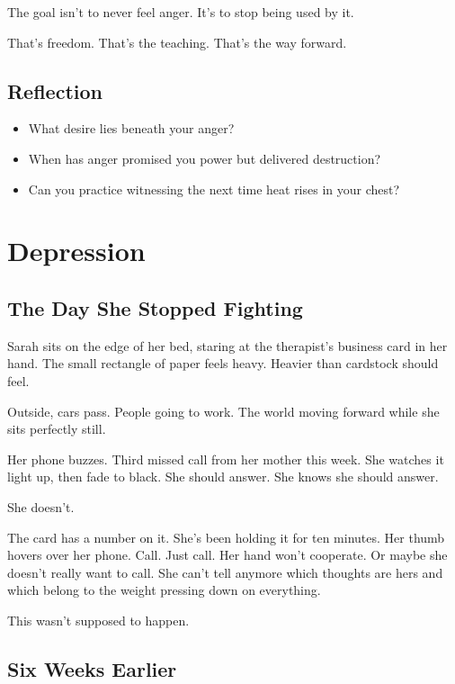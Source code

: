 \documentclass[11pt,twoside]{book}
\begin{document}
The goal isn't to never feel anger. It's to stop being used by it.

That's freedom. That's the teaching. That's the way forward.

\section*{Reflection}

\begin{itemize}
\item What desire lies beneath your anger?
\item When has anger promised you power but delivered destruction?
\item Can you practice witnessing the next time heat rises in your chest?
\end{itemize}

\chapter{Depression}

\section*{The Day She Stopped Fighting}

Sarah sits on the edge of her bed, staring at the therapist's business card in her hand. The small rectangle of paper feels heavy. Heavier than cardstock should feel.

Outside, cars pass. People going to work. The world moving forward while she sits perfectly still.

Her phone buzzes. Third missed call from her mother this week. She watches it light up, then fade to black. She should answer. She knows she should answer.

She doesn't.

The card has a number on it. She's been holding it for ten minutes. Her thumb hovers over her phone. Call. Just call. Her hand won't cooperate. Or maybe she doesn't really want to call. She can't tell anymore which thoughts are hers and which belong to the weight pressing down on everything.

This wasn't supposed to happen.

\section*{Six Weeks Earlier}
\end{document}
